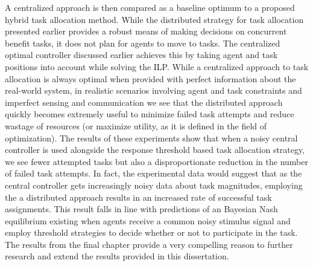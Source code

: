 \documentclass[12pt]{book}
\begin{document}
A centralized approach is then compared as a baseline optimum to a proposed hybrid task allocation method. While the distributed strategy for task allocation presented earlier provides a robust means of making decisions on concurrent benefit tasks, it does not plan for agents to move to tasks. The centralized optimal controller discussed earlier achieves this by taking agent and task positions into account while solving the ILP. While a centralized approach to task allocation is always optimal when provided with perfect information about the real-world system, in realistic scenarios involving agent and task constraints and imperfect sensing and communication we see that the distributed approach quickly becomes extremely useful to minimize failed task attempts and reduce wastage of resources (or maximize utility, as it is defined in the field of optimization). The results of these experiments show that when a noisy central controller is used alongside the response threshold based task allocation strategy, we see fewer attempted tasks but also a disproportionate reduction in the number of failed task attempts. In fact, the experimental data would suggest that as the central controller gets increasingly noisy data about task magnitudes, employing the a distributed approach results in an increased rate of successful task assignments. This result falls in line with predictions of an Bayesian Nash equilibrium existing when agents receive a common noisy stimulus signal and employ threshold strategies to decide whether or not to participate in the task. The results from the final chapter provide a very compelling reason to further research and extend the results provided in this dissertation.



\end{document}
